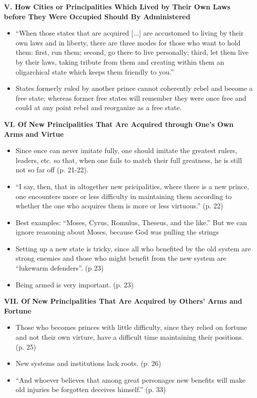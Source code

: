 \documentclass[10pt]{article}
\newcommand{\keyquote}[1]{{\color{BrickRed}#1}}
\begin{document}
\textbf{V. How Cities or Principalities Which Lived by Their Own Laws 
before They Were Occupied Should By Administered}
\begin{itemize}
\item
    ``When those states that are acquired [...] are accustomed to
    living by their own laws and in liberty, there are three
    modes for those who want to hold them: first, run them;
    second, go there to live personally; third, let them live
    by their laws, taking tribute from them and creating
    within them an oligarchical state which keeps them friendly
    to you.''
\item
    States formerly ruled by another prince cannot coherently rebel 
    and become a free state; whereas former free states will remember
    they were once free and could at any point rebel and reorganize
    as a free state.
\end{itemize}

\textbf{VI. Of New Principalities That Are Acquired through One's
Own Arms and Virtue}
\begin{itemize}
\item
    Since once can never imitate fully, one should imitate the greatest
    rulers, leaders, etc. so that, when one fails to match their full
    greatness, he is still not so far off (p. 21-22). 
\item 
    ``I say, then, that in altogether new pricipalities, where there is a new
    prince, one encounters more or less difficulty in maintaining them
    according to whether the one who acquires them is more or less
    virtuous.'' (p. 22)
\item
    Best examples: ``Moses, Cyrus, Romulus, Theseus, and the like.'' But
    we can ignore reasoning about Moses, because God was pulling the strings
\item
    Setting up a new state is tricky, since all who benefited by the old
    system are strong enemies and those who might benefit from the 
    new system are ``lukewarm defenders''. (p 23)
\item
    Being armed is very important. (p. 23)
\end{itemize}

\textbf{VII. Of New Principalities That Are Acquired by Others'
Arms and Fortune}
\begin{itemize}
\item
    Those who becomes princes with little difficulty, since they relied on
    fortune and not their own virture, have a difficult time maintaining
    their positions. (p. 25)
\item
    New systems and institutions lack roots. (p. 26)
\item
    \keyquote{``And whoever believes that among great personages new
    benefits will make old injuries be forgotten deceives himself.''}
    (p. 33) 
\end{itemize}
\end{document}
